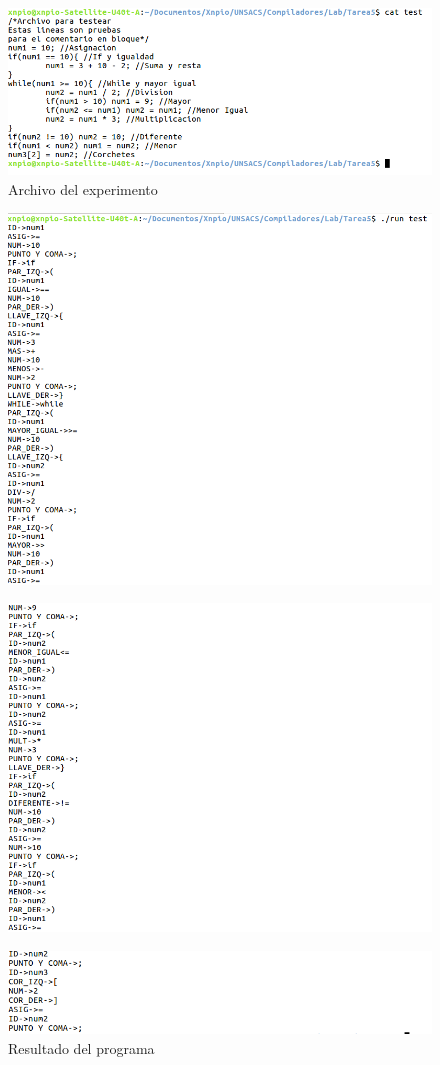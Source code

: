 \documentclass[a4paper,12pt]{article}
\begin{document}
\begin{figure}[H]
 \centering
 \includegraphics[scale = 0.5]{1.png}
 \caption{Archivo del experimento}
\end{figure}
\begin{figure}[H]
 \centering
 \includegraphics[scale = 0.5]{2.png}
\end{figure}
\begin{figure}[H]
 \centering
 \includegraphics[scale = 0.5]{3.png}
\end{figure}
\begin{figure}[H]
 \centering
 \includegraphics[scale = 0.5]{4.png}
 \caption{Resultado del programa}
\end{figure}
\end{document}
